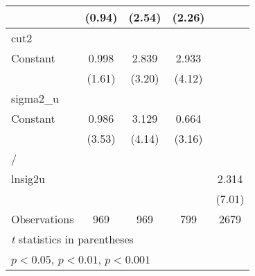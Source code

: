 {\begin{longtable}{l*{4}{c}}
                &   (0.94)         &   (2.54)         &   (2.26)         &                  \\
\hline
cut2            &                  &                  &                  &                  \\
Constant        &    0.998         &    2.839\sym{**} &    2.933\sym{***}&                  \\
                &   (1.61)         &   (3.20)         &   (4.12)         &                  \\
\hline
sigma2\_u        &                  &                  &                  &                  \\
Constant        &    0.986\sym{***}&    3.129\sym{***}&    0.664\sym{**} &                  \\
                &   (3.53)         &   (4.14)         &   (3.16)         &                  \\
\hline
/               &                  &                  &                  &                  \\
lnsig2u         &                  &                  &                  &    2.314\sym{***}\\
                &                  &                  &                  &   (7.01)         \\
\hline
Observations    &      969         &      969         &      799         &     2679         \\
\hline\hline
\multicolumn{5}{l}{\footnotesize \textit{t} statistics in parentheses}\\
\multicolumn{5}{l}{\footnotesize \sym{*} \(p<0.05\), \sym{**} \(p<0.01\), \sym{***} \(p<0.001\)}\\
\end{longtable}
}
